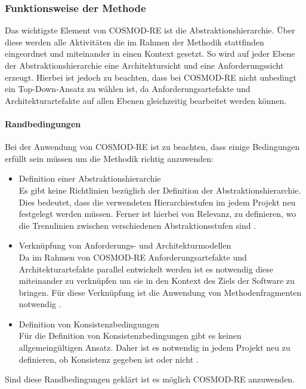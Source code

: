 \subsubsection{Funktionsweise der Methode}
Das wichtigste Element von COSMOD-RE ist die Abstraktionshierarchie. Über diese werden alle Aktivitäten die im Rahmen der Methodik stattfinden eingeordnet und miteinander in einen Kontext gesetzt. So wird auf jeder Ebene der Abstraktionshierarchie eine Architektursicht und eine Anforderungssicht erzeugt. Hierbei ist jedoch zu beachten, dass bei COSMOD-RE nicht unbedingt ein Top-Down-Ansatz zu wählen ist, da Anforderungsartefakte und Architekturartefakte auf allen Ebenen gleichzeitig bearbeitet werden können.\\

\paragraph{Randbedingungen}
Bei der Anwendung von COSMOD-RE ist zu beachten, dass einige Bedingungen erfüllt sein müssen um die Methodik richtig anzuwenden:\\

\begin{itemize}
\item Definition einer Abstraktionshierarchie \\
Es gibt keine Richtlinien bezüglich der Definition der Abstraktionshierarchie. Dies bedeutet, dass die verwendeten Hierarchiestufen im jedem Projekt neu festgelegt werden müssen. Ferner ist hierbei von Relevanz, zu definieren, wo die Trennlinien zwischen verschiedenen Abstraktionsstufen sind \cite{sikora}.
\item Verknüpfung von Anforderungs- und Architekturmodellen \\
Da im Rahmen von COSMOD-RE Anforderungsartefakte und Architekturartefakte parallel entwickelt werden ist es notwendig diese miteinander zu verknüpfen um sie in den Kontext des Ziels der Software zu bringen. Für diese Verknüpfung ist die Anwendung von Methodenfragmenten notwendig \cite{sikora}.
\item Definition von Konsistenzbedingungen \\
Für die Definition von Konsistenzbedingungen gibt es keinen allgemeingültigen Ansatz. Daher ist es notwendig in jedem Projekt neu zu definieren, ob Konsistenz gegeben ist oder nicht \cite{sikora}.\\
\end{itemize}

Sind diese Randbedingungen geklärt ist es möglich COSMOD-RE anzuwenden.\\

